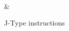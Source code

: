 \begin{figure}[h]
	\centering
	\begin{bytefield}[endianness=big,bitwidth=0.03\linewidth]{32}
		 \\
		 &
	\end{bytefield}

	\caption{J-Type instructions}
	\label{fig:jtype_format}
\end{figure}
